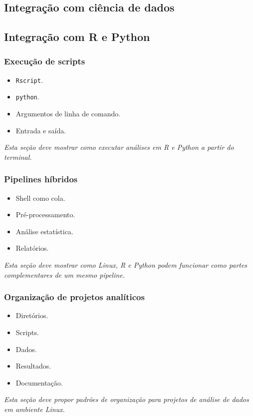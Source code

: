 \documentclass[12pt,openany]{book}
\newcommand{\placeholder}[1]{
    \par\medskip
    \noindent\textit{#1}
    \par\medskip
}
\newcommand{\topicos}[1]{
    \begin{itemize}
        #1
    \end{itemize}
}
\begin{document}
\begin{refsection}
\part{Integração com ciência de dados}

\chapter{Integração com R e Python}

\section{Execução de scripts}

\topicos{
    \item \texttt{Rscript}.
    \item \texttt{python}.
    \item Argumentos de linha de comando.
    \item Entrada e saída.
}

\placeholder{Esta seção deve mostrar como executar análises em R e Python a partir do terminal.}

\section{Pipelines híbridos}

\topicos{
    \item Shell como cola.
    \item Pré-processamento.
    \item Análise estatística.
    \item Relatórios.
}

\placeholder{Esta seção deve mostrar como Linux, R e Python podem funcionar como partes complementares de um mesmo pipeline.}

\section{Organização de projetos analíticos}

\topicos{
    \item Diretórios.
    \item Scripts.
    \item Dados.
    \item Resultados.
    \item Documentação.
}

\placeholder{Esta seção deve propor padrões de organização para projetos de análise de dados em ambiente Linux.}


\end{refsection}
\end{document}
